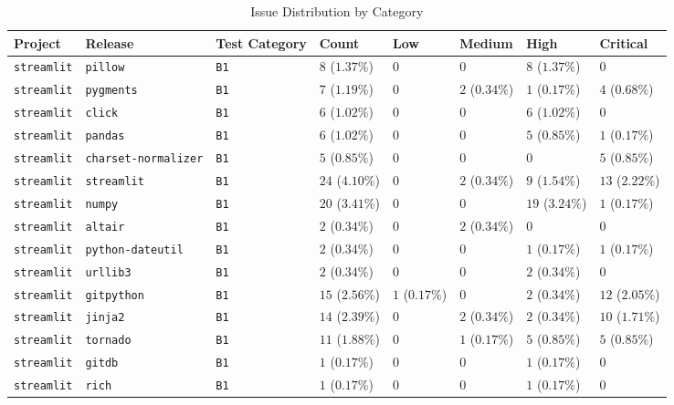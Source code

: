 \begin{table}
\caption{Issue Distribution by Category}
\label{tab:issue-category-distribution}
\begin{tabular}{llllllll}
\toprule
Project & Release & Test Category & Count & Low & Medium & High & Critical \\
\midrule
\texttt{streamlit} & \texttt{pillow} & \texttt{B1} & $8$ ($1.37\%$) & $0$ & $0$ & $8$ ($1.37\%$) & $0$ \\
\texttt{streamlit} & \texttt{pygments} & \texttt{B1} & $7$ ($1.19\%$) & $0$ & $2$ ($0.34\%$) & $1$ ($0.17\%$) & $4$ ($0.68\%$) \\
\texttt{streamlit} & \texttt{click} & \texttt{B1} & $6$ ($1.02\%$) & $0$ & $0$ & $6$ ($1.02\%$) & $0$ \\
\texttt{streamlit} & \texttt{pandas} & \texttt{B1} & $6$ ($1.02\%$) & $0$ & $0$ & $5$ ($0.85\%$) & $1$ ($0.17\%$) \\
\texttt{streamlit} & \texttt{charset-normalizer} & \texttt{B1} & $5$ ($0.85\%$) & $0$ & $0$ & $0$ & $5$ ($0.85\%$) \\
\texttt{streamlit} & \texttt{streamlit} & \texttt{B1} & $24$ ($4.10\%$) & $0$ & $2$ ($0.34\%$) & $9$ ($1.54\%$) & $13$ ($2.22\%$) \\
\texttt{streamlit} & \texttt{numpy} & \texttt{B1} & $20$ ($3.41\%$) & $0$ & $0$ & $19$ ($3.24\%$) & $1$ ($0.17\%$) \\
\texttt{streamlit} & \texttt{altair} & \texttt{B1} & $2$ ($0.34\%$) & $0$ & $2$ ($0.34\%$) & $0$ & $0$ \\
\texttt{streamlit} & \texttt{python-dateutil} & \texttt{B1} & $2$ ($0.34\%$) & $0$ & $0$ & $1$ ($0.17\%$) & $1$ ($0.17\%$) \\
\texttt{streamlit} & \texttt{urllib3} & \texttt{B1} & $2$ ($0.34\%$) & $0$ & $0$ & $2$ ($0.34\%$) & $0$ \\
\texttt{streamlit} & \texttt{gitpython} & \texttt{B1} & $15$ ($2.56\%$) & $1$ ($0.17\%$) & $0$ & $2$ ($0.34\%$) & $12$ ($2.05\%$) \\
\texttt{streamlit} & \texttt{jinja2} & \texttt{B1} & $14$ ($2.39\%$) & $0$ & $2$ ($0.34\%$) & $2$ ($0.34\%$) & $10$ ($1.71\%$) \\
\texttt{streamlit} & \texttt{tornado} & \texttt{B1} & $11$ ($1.88\%$) & $0$ & $1$ ($0.17\%$) & $5$ ($0.85\%$) & $5$ ($0.85\%$) \\
\texttt{streamlit} & \texttt{gitdb} & \texttt{B1} & $1$ ($0.17\%$) & $0$ & $0$ & $1$ ($0.17\%$) & $0$ \\
\texttt{streamlit} & \texttt{rich} & \texttt{B1} & $1$ ($0.17\%$) & $0$ & $0$ & $1$ ($0.17\%$) & $0$ \\

\end{tabular}
\end{table}
